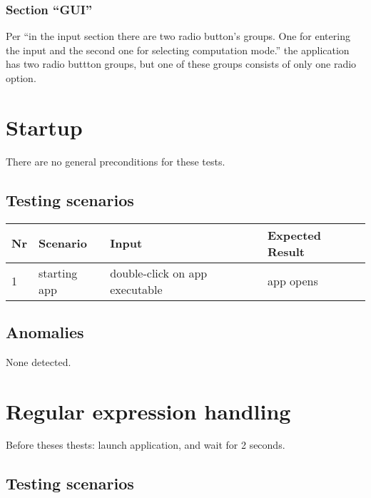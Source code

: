 \documentclass{article}
\begin{document}
\subsubsection{Section ``GUI''}
Per ``in the input section there are two radio button’s groups. One for entering the input and the
second one for selecting computation mode.'' the application has two radio buttton groups, but one
of these groups consists of only one radio option.

\section{Startup}
There are no general preconditions for these tests. 

\subsection{Testing scenarios}

\begin{center}
\begin{tabularx}{\textwidth}{llXX}
\toprule
\textbf{Nr} & \textbf{Scenario} & \textbf{Input} & \textbf{Expected Result}  \\
\midrule
1 & starting app
& double-click on app executable
& app opens \\
\bottomrule
\end{tabularx}
\end{center}

\subsection{Anomalies}
None detected.

\newpage

\section{Regular expression handling}
Before theses thests: launch application, and wait for 2 seconds.

\subsection{Testing scenarios}
\end{document}

